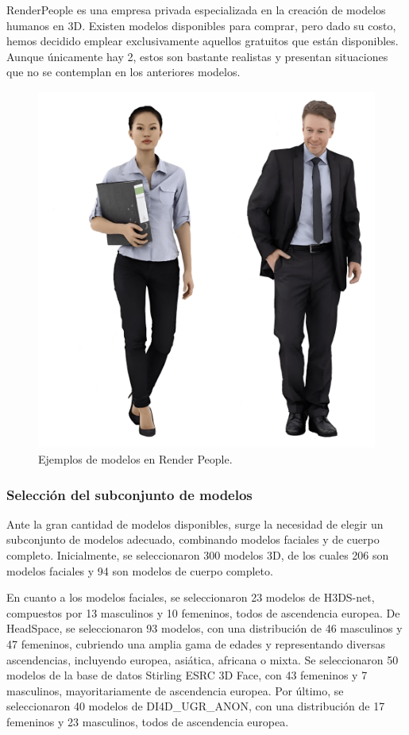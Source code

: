 RenderPeople es una empresa privada especializada en la creación de modelos humanos en 3D. Existen modelos disponibles para comprar, pero dado su costo, hemos decidido emplear exclusivamente aquellos gratuitos que están disponibles. Aunque únicamente hay 2, estos son bastante realistas y presentan situaciones que no se contemplan en los anteriores modelos.

\begin{figure}[h]
	\centering
	\includegraphics[scale=0.04]{imagenes/cap4/renderpeople.png}
	\caption[Ejemplos Render People]{Ejemplos de modelos en Render People.}
	\label{fig21}
\end{figure}

\subsubsection{Selección del subconjunto de modelos}

Ante la gran cantidad de modelos disponibles, surge la necesidad de elegir un subconjunto de modelos adecuado, combinando modelos faciales y de cuerpo completo.
Inicialmente, se seleccionaron 300 modelos 3D, de los cuales 206 son modelos faciales y 94 son modelos de cuerpo completo.

En cuanto a los modelos faciales, se seleccionaron 23 modelos de H3DS-net, compuestos por 13 masculinos y 10 femeninos, todos de ascendencia europea. De HeadSpace, se seleccionaron 93 modelos, con una distribución de 46 masculinos y 47 femeninos, cubriendo una amplia gama de edades y representando diversas ascendencias, incluyendo europea, asiática, africana o mixta. Se seleccionaron 50 modelos de la base de datos Stirling ESRC 3D Face, con 43 femeninos y 7 masculinos, mayoritariamente de ascendencia europea. Por último, se seleccionaron 40 modelos de DI4D\_UGR\_ANON, con una distribución de 17 femeninos y 23 masculinos, todos de ascendencia europea.

